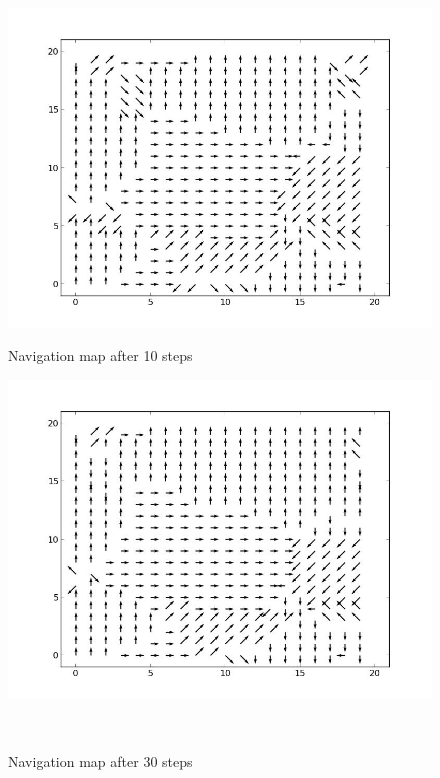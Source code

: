 \documentclass[a4paper, 11pt]{article}
\begin{document}
\begin{figure}
  \centering
  \begin{minipage}[c]{0.5\textwidth}
    \centering
    \includegraphics[scale=0.3]{../figure/navMp10.jpeg}
      \caption{Navigation map after 10 steps}
  \end{minipage}%
  \begin{minipage}[c]{0.5\textwidth}
    \centering
    \includegraphics[scale=0.3]{../figure/navMp30.jpeg}
      \caption{Navigation map after 30 steps}
    \end{minipage}
    \\
  \centering
  \begin{minipage}[c]{0.5\textwidth}
    \centering

\end{minipage}
\end{figure}
\end{document}
